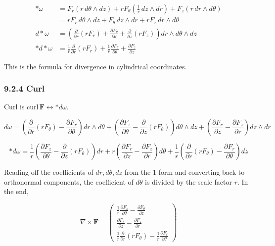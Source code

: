 \documentclass[a4paper,12pt,openany]{book}
\begin{document}
\[\begin{aligned}
\ast\omega &= F_r(r\,d\theta\wedge dz) + rF_\theta\!\left(\frac{1}{r}\,dz\wedge dr\right) + F_z(r\,dr\wedge d\theta) \\
&= rF_r\,d\theta\wedge dz + F_\theta\,dz\wedge dr + rF_z\,dr\wedge d\theta \\[0.3em]
d\ast\omega &= \left(\frac{\partial}{\partial r}(rF_r) + \frac{\partial F_\theta}{\partial\theta} + \frac{\partial}{\partial z}(rF_z)\right) dr\wedge d\theta\wedge dz \\[0.3em]
\ast d\ast\omega &= \frac{1}{r}\frac{\partial}{\partial r}(rF_r) + \frac{1}{r}\frac{\partial F_\theta}{\partial\theta} + \frac{\partial F_z}{\partial z}
\end{aligned}\]

This is the formula for divergence in cylindrical coordinates.

\hypertarget{curl-2}{%
\subsubsection{9.2.4 Curl}\label{curl-2}}

Curl is \(\mathrm{curl}\,\mathbf{F} \leftrightarrow \ast d\omega\).

\[d\omega = \left(\frac{\partial}{\partial r}(rF_\theta) - \frac{\partial F_r}{\partial\theta}\right) dr\wedge d\theta + \left(\frac{\partial F_z}{\partial\theta} - \frac{\partial}{\partial z}(rF_\theta)\right) d\theta\wedge dz + \left(\frac{\partial F_r}{\partial z} - \frac{\partial F_z}{\partial r}\right) dz\wedge dr\]

\[\ast d\omega = \frac{1}{r}\!\left(\frac{\partial F_z}{\partial\theta} - \frac{\partial}{\partial z}(rF_\theta)\right)\! dr + r\!\left(\frac{\partial F_r}{\partial z} - \frac{\partial F_z}{\partial r}\right)\! d\theta + \frac{1}{r}\!\left(\frac{\partial}{\partial r}(rF_\theta) - \frac{\partial F_r}{\partial\theta}\right)\! dz\]

Reading off the coefficients of \(dr, d\theta, dz\) from the \(1\)-form
and converting back to orthonormal components, the coefficient of
\(d\theta\) is divided by the scale factor \(r\). In the end,

\[\nabla \times \mathbf{F} = \begin{pmatrix}
\frac{1}{r}\frac{\partial F_z}{\partial \theta} - \frac{\partial F_\theta}{\partial z} \\[0.3em]
\frac{\partial F_r}{\partial z} - \frac{\partial F_z}{\partial r} \\[0.3em]
\frac{1}{r}\frac{\partial}{\partial r}(r F_\theta) - \frac{1}{r}\frac{\partial F_r}{\partial \theta}
\end{pmatrix}\]
\end{document}

